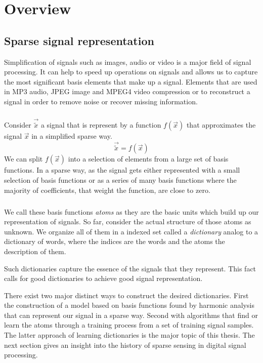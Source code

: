 \chapter{Overview}

\section{Sparse signal representation}
\label{sec:dicts}
Simplification of signals such as images, audio or video is a major
field of signal processing. It can help to speed up operations on signals and
allows us to capture the most significant basis elements that make up a signal.
Elements that are used in MP3 audio, JPEG image and MPEG4 video compression or
to reconstruct a signal in order to remove noise or recover missing information.

\paragraph{}
Consider $\vec{\tilde{x}}$ a signal that is represent by a function $f(\vec{x})$
that
approximates the signal $\vec{x}$ in a simplified sparse way.
\begin{equation*}
\vec{\tilde{x}} = f\left(\vec{x}\right)
\end{equation*}
We can split $f(\vec{x})$ into a selection of elements from a large set of
basis functions. In a sparse way, as the signal gets either represented with
a small selection of basis functions or as a series of many basis
functions where the majority of coefficients, that weight the function, are
close to zero. 

\paragraph{}
We call these basis functions \emph{atoms} as they are the basic units
which build up our representation of signals. So far, consider the actual
structure of those atoms as unknown. We organize all of them in a
indexed set called a \emph{dictionary} analog to a dictionary of words, where
the indices are the words and the atoms the description of them. 

Such dictionaries capture the essence of the signals that they represent.
This fact calls for good dictionaries to achieve good signal representation.

There exist two major distinct ways to construct the desired dictionaries. 
First the construction of a model based on basis functions found by harmonic
analysis that can represent our signal in a sparse way. Second with
algorithms that find or learn the atoms through a training process from a set of
training signal samples. The latter approach of learning dictionaries is the
major topic of this thesis. The next section gives an insight into the history
of sparse sensing in digital signal processing. 



